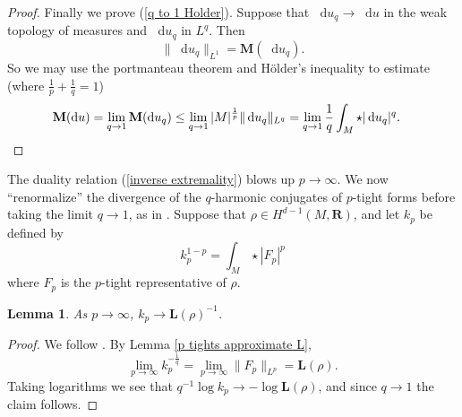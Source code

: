 \documentclass[reqno,11pt]{amsart}
\newcommand{\RR}{\mathbf{R}}
\newcommand*\dif{\mathop{}\!\mathrm{d}}
\newcommand{\Mass}{\mathbf M}
\newcommand{\Comass}{\mathbf L}
\newtheorem{lemma}[theorem]{Lemma}
\theoremstyle{definition}
\numberwithin{equation}{section}
\begin{document}
\begin{proof}
Finally we prove (\ref{q to 1 Holder}).
Suppose that $\dif u_q \to \dif u$ in the weak topology of measures and $\dif u_q$ in $L^q$.
Then
$$\|\dif u_q\|_{L^1} = \Mass(\dif u_q).$$
So we may use the portmanteau theorem and H\"older's inequality to estimate (where $\frac{1}{p} + \frac{1}{q} = 1$)
\begin{align*}
\Mass(\dif u) &= \lim_{q \to 1} \Mass(\dif u_q) \leq \lim_{q \to 1} |M|^{\frac{1}{p}} \|\dif u_q\|_{L^q} = \lim_{q \to 1} \frac{1}{q} \int_M \star |\dif u_q|^q. \qedhere
\end{align*}
\end{proof}

The duality relation (\ref{inverse extremality}) blows up $p \to \infty$.
We now ``renormalize'' the divergence of the $q$-harmonic conjugates of $p$-tight forms before taking the limit $q \to 1$, as in \cite[\S3.2]{daskalopoulos2020transverse}.
Suppose that $\rho \in H^{d - 1}(M, \RR)$, and let $k_p$ be defined by 
$$k_p^{1 - p} = \int_M \star |F_p|^p$$
where $F_p$ is the $p$-tight representative of $\rho$.

\begin{lemma}\label{normalizations converge}
As $p \to \infty$, $k_p \to \Comass(\rho)^{-1}$.
\end{lemma}
\begin{proof}
We follow \cite[Lemma 3.4]{daskalopoulos2020transverse}.
By Lemma \ref{p tights approximate L},
$$\lim_{p \to \infty} k_p^{-\frac{1}{q}} = \lim_{p \to \infty} \|F_p\|_{L^p} = \Comass(\rho).$$
Taking logarithms we see that $q^{-1} \log k_p \to -\log \Comass(\rho)$, and since $q \to 1$ the claim follows.
\end{proof}
\end{document}
